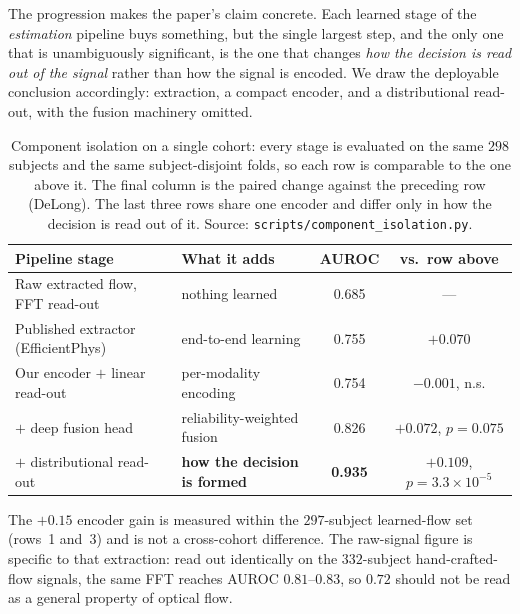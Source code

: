 \documentclass[journal]{IEEEtran}
\begin{document}
The progression makes the paper's claim concrete. Each learned stage of the \emph{estimation} pipeline
buys something, but the single largest step, and the only one that is unambiguously significant, is the
one that changes \emph{how the decision is read out of the signal} rather than how the signal is
encoded. We draw the deployable conclusion accordingly: extraction, a compact encoder, and a
distributional read-out, with the fusion machinery omitted.

\begin{table}[!t]\caption{Component isolation on a single cohort: every stage is evaluated on the same $298$ subjects and the same subject-disjoint folds, so each row is comparable to the one above it. The final column is the paired change against the preceding row (DeLong). The last three rows share one encoder and differ only in how the decision is read out of it. Source: \texttt{scripts/component\_isolation.py}.}\label{tab:simple}\centering\small
\begin{tabular}{@{}llcc@{}}\toprule
Pipeline stage & What it adds & AUROC & vs.\ row above\\\midrule
Raw extracted flow, FFT read-out & nothing learned & 0.685 & ---\\
Published extractor (EfficientPhys) & end-to-end learning & 0.755 & $+0.070$\\
Our encoder $+$ linear read-out & per-modality encoding & 0.754 & $-0.001$, n.s.\\
\quad $+$ deep fusion head & reliability-weighted fusion & 0.826 & $+0.072$, $p{=}0.075$\\
\quad $+$ distributional read-out & \textbf{how the decision is formed} & \textbf{0.935} & $\mathbf{+0.109}$, $p{=}3.3{\times}10^{-5}$\\
\bottomrule
\end{tabular}
\vspace{2pt}
{\footnotesize The $+0.15$ encoder gain is measured within the $297$-subject learned-flow set (rows~1
and~3) and is not a cross-cohort difference. The raw-signal figure is specific to that extraction: read
out identically on the $332$-subject hand-crafted-flow signals, the same FFT reaches AUROC
$0.81$--$0.83$, so $0.72$ should not be read as a general property of optical flow.}
\end{table}
\end{document}
